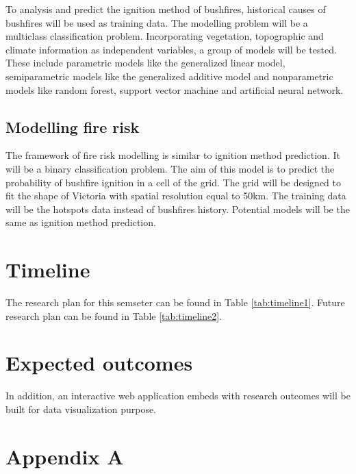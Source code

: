 \documentclass[11pt,a4paper,]{article}
\begin{document}
To analysis and predict the ignition method of bushfires, historical causes of bushfires will be used as training data. The modelling problem will be a multiclass classification problem. Incorporating vegetation, topographic and climate information as independent variables, a group of models will be tested. These include parametric models like the generalized linear model, semiparametric models like the generalized additive model and nonparametric models like random forest, support vector machine and artificial neural network.

\hypertarget{modelling-fire-risk}{%
\subsection{Modelling fire risk}\label{modelling-fire-risk}}

The framework of fire risk modelling is similar to ignition method prediction. It will be a binary classification problem. The aim of this model is to predict the probability of bushfire ignition in a cell of the grid. The grid will be designed to fit the shape of Victoria with spatial resolution equal to 50km. The training data will be the hotspots data instead of bushfires history. Potential models will be the same as ignition method prediction.

\hypertarget{timeline}{%
\section{Timeline}\label{timeline}}

The research plan for this semseter can be found in Table \ref{tab:timeline1}. Future research plan can be found in Table \ref{tab:timeline2}.

\hypertarget{expected-outcomes}{%
\section{Expected outcomes}\label{expected-outcomes}}

In addition, an interactive web application embeds with research outcomes will be built for data visualization purpose.

\newpage

\hypertarget{appendix-a}{%
\section*{Appendix A}\label{appendix-a}}
\end{document}
